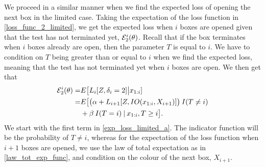 We proceed in a similar manner when we find the expected loss of opening the next box in the limited case. Taking the expectation of the loss function in \eqref{loss_func_2_limited}, we get the expected loss when $i$ boxes are opened given that the test has not terminated yet, $\mathcal{E}^i_2(\theta)$. Recall that if the box terminates when $i$ boxes already are open, then the parameter $T$ is equal to $i$. We have to condition on $T$ being greater than or equal to $i$ when we find the expected loss, meaning that the test has not terminated yet when $i$ boxes are open. We then get that
\begin{equation}
\label{exp_loss_limited_a}
    \begin{aligned}
        \mathcal{E}^i_{2}(\theta) 
        = &E\big[L_i[Z,\delta_i=2]\big|x_{1:i}] \\
        =& E\big[\big( \alpha + L_{i+1}[Z,IO(x_{1:i},X_{i+1})] \big) \: I(T\neq i) \\
        &+ \beta \: I(T=i) \: | \: x_{1:i}, T\geq i\big].
    \end{aligned}
\end{equation}
We start with the first term in \eqref{exp_loss_limited_a}. The indicator function will be the probability of $T\neq i$, whereas for the expectation of the loss function when $i+1$ boxes are opened, we use the law of total expectation as in \eqref{law_tot_exp_func}, and condition on the colour of the next box, $X_{i+1}$. 

